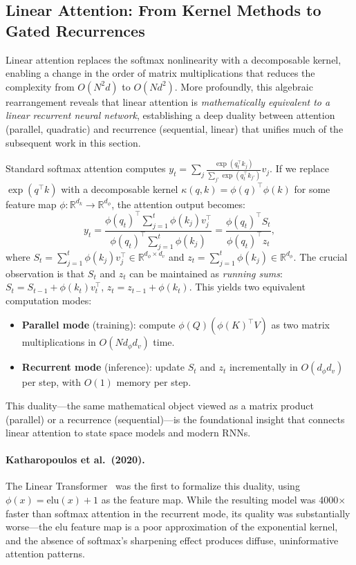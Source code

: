 \documentclass[11pt,a4paper]{article}
\begin{document}
\subsection{Linear Attention: From Kernel Methods to Gated Recurrences}
\label{subsec:linear-attn}

Linear attention replaces the softmax nonlinearity with a decomposable kernel, enabling a change in the order of matrix multiplications that reduces the complexity from $O(N^2 d)$ to $O(N d^2)$. More profoundly, this algebraic rearrangement reveals that linear attention is \emph{mathematically equivalent to a linear recurrent neural network}, establishing a deep duality between attention (parallel, quadratic) and recurrence (sequential, linear) that unifies much of the subsequent work in this section.

Standard softmax attention computes $y_t = \sum_j \frac{\exp(q_t^\top k_j)}{\sum_{j'} \exp(q_t^\top k_{j'})} v_j$. If we replace $\exp(q^\top k)$ with a decomposable kernel $\kappa(q, k) = \phi(q)^\top \phi(k)$ for some feature map $\phi: \mathbb{R}^{d_k} \to \mathbb{R}^{d_\phi}$, the attention output becomes:
\begin{equation}
y_t = \frac{\phi(q_t)^\top \sum_{j=1}^{t} \phi(k_j) v_j^\top}{\phi(q_t)^\top \sum_{j=1}^{t} \phi(k_j)} = \frac{\phi(q_t)^\top S_t}{\phi(q_t)^\top z_t},
\label{eq:linear-attn}
\end{equation}
where $S_t = \sum_{j=1}^{t} \phi(k_j) v_j^\top \in \mathbb{R}^{d_\phi \times d_v}$ and $z_t = \sum_{j=1}^{t} \phi(k_j) \in \mathbb{R}^{d_\phi}$. The crucial observation is that $S_t$ and $z_t$ can be maintained as \emph{running sums}: $S_t = S_{t-1} + \phi(k_t) v_t^\top$, $z_t = z_{t-1} + \phi(k_t)$. This yields two equivalent computation modes:
\begin{itemize}[nosep]
\item \textbf{Parallel mode} (training): compute $\phi(Q) (\phi(K)^\top V)$ as two matrix multiplications in $O(N d_\phi d_v)$ time.
\item \textbf{Recurrent mode} (inference): update $S_t$ and $z_t$ incrementally in $O(d_\phi d_v)$ per step, with $O(1)$ memory per step.
\end{itemize}
This duality---the same mathematical object viewed as a matrix product (parallel) or a recurrence (sequential)---is the foundational insight that connects linear attention to state space models and modern RNNs.

\paragraph{Katharopoulos et al.\ (2020).}
The Linear Transformer~\cite{katharopoulos2020transformers} was the first to formalize this duality, using $\phi(x) = \text{elu}(x) + 1$ as the feature map. While the resulting model was 4000$\times$ faster than softmax attention in the recurrent mode, its quality was substantially worse---the elu feature map is a poor approximation of the exponential kernel, and the absence of softmax's sharpening effect produces diffuse, uninformative attention patterns.
\end{document}
